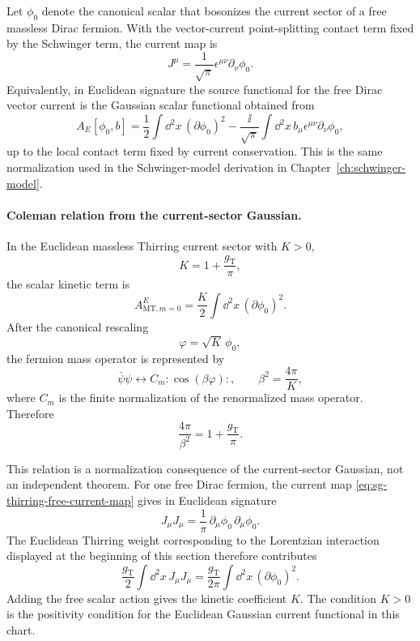 Let \(\phi_0\) denote the canonical scalar that bosonizes the current sector
of a free massless Dirac fermion.  With the vector-current point-splitting
contact term fixed by the Schwinger term, the current map is
\begin{equation}
  J^\mu
  =
  \frac{1}{\sqrt\pi}\epsilon^{\mu\nu}\partial_\nu\phi_0 .
  \label{eq:sg-thirring-free-current-map}
\end{equation}
Equivalently, in Euclidean signature the source functional for the free
Dirac vector current is the Gaussian scalar functional obtained from
\[
  A_E[\phi_0,b]
  =
  \frac12\int\dd^2x\,(\partial\phi_0)^2
  -\frac{\ii}{\sqrt\pi}
  \int\dd^2x\,b_\mu\epsilon^{\mu\nu}\partial_\nu\phi_0 ,
\]
up to the local contact term fixed by current conservation.  This is the
same normalization used in the Schwinger-model derivation in
Chapter~\ref{ch:schwinger-model}.

\paragraph{Coleman relation from the current-sector Gaussian.}
In the Euclidean massless Thirring current sector with \(K>0\),
\[
  K=1+\frac{g_{\mathrm T}}{\pi},
\]
the scalar kinetic term is
\[
  A_{\mathrm{MT},m=0}^{E}
  =
  \frac{K}{2}\int\dd^2x\,(\partial\phi_0)^2 .
\]
After the canonical rescaling
\[
  \varphi=\sqrt K\,\phi_0 ,
\]
the fermion mass operator is represented by
\[
  \bar\psi\psi
  \longleftrightarrow
  C_m:\!\cos(\beta\varphi)\!: ,
  \qquad
  \beta^2=\frac{4\pi}{K},
\]
where \(C_m\) is the finite normalization of the renormalized mass operator.
Therefore
\begin{equation}
  \frac{4\pi}{\beta^2}=1+\frac{g_{\mathrm T}}{\pi}.
  \label{eq:sg-thirring-coleman-relation}
\end{equation}

This relation is a normalization consequence of the current-sector Gaussian,
not an independent theorem.  For one free Dirac fermion, the current map
\eqref{eq:sg-thirring-free-current-map} gives in Euclidean signature
\[
  J_\mu J_\mu=\frac1\pi\,\partial_\mu\phi_0\,\partial_\mu\phi_0 .
\]
The Euclidean Thirring weight corresponding to the Lorentzian interaction
displayed at the beginning of this section therefore contributes
\[
  \frac{g_{\mathrm T}}{2}
  \int\dd^2x\,J_\mu J_\mu
  =
  \frac{g_{\mathrm T}}{2\pi}
  \int\dd^2x\,(\partial\phi_0)^2 .
\]
Adding the free scalar action gives the kinetic coefficient \(K\).  The
condition \(K>0\) is the positivity condition for the Euclidean Gaussian
current functional in this chart.

